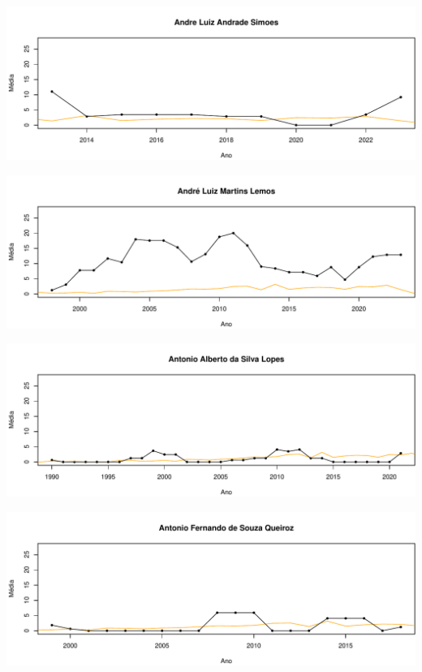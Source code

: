 \documentclass[12pt,brazil]{article}\usepackage[]{graphicx}\usepackage[]{xcolor}
\makeatletter
\def\maxwidth{ %
  \ifdim\Gin@nat@width>\linewidth
    \linewidth
  \else
    \Gin@nat@width
  \fi
}
\makeatother
\begin{document}
\vspace{0.5cm}


{\centering \includegraphics[width=\maxwidth]{figure/mediamovel-2} 

}



\vspace{0.5cm}


{\centering \includegraphics[width=\maxwidth]{figure/mediamovel-3} 

}



\vspace{0.5cm}


{\centering \includegraphics[width=\maxwidth]{figure/mediamovel-4} 

}



\vspace{0.5cm}


{\centering \includegraphics[width=\maxwidth]{figure/mediamovel-5} 

}
\end{document}
